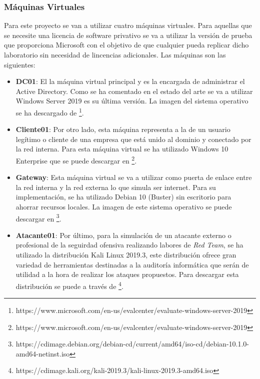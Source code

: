 \subsubsection{Máquinas Virtuales}

Para este proyecto se van a utilizar cuatro máquinas virtuales. Para aquellas que se necesite una licencia de software privativo se va a utilizar la versión de prueba que proporciona Microsoft con el objetivo de que cualquier pueda replicar dicho laboratorio sin necesidad de lincencias adicionales. Las máquinas son las siguientes:

\begin{itemize}
\item \textbf{DC01}: El la máquina virtual principal y es la encargada de administrar el Active Directory. Como se ha comentado en el estado del arte se va a utilizar Windows Server 2019 es su última versión. La imagen del sistema operativo se ha descargado de \footnote{https://www.microsoft.com/en-us/evalcenter/evaluate-windows-server-2019}.

\item \textbf{Cliente01}: Por otro lado, esta máquina representa a la de un usuario legítimo o cliente de una empresa que está unido al dominio y conectado por la red interna. Para esta máquina virtual se ha utilizado Windows 10 Enterprise que se puede descargar en \footnote{https://www.microsoft.com/en-us/evalcenter/evaluate-windows-server-2019}. 

\item \textbf{Gateway}: Esta máquina virtual se va a utilizar como puerta de enlace entre la red interna y la red externa lo que simula ser internet. Para su implementación, se ha utilizado Debian 10 (Buster) sin escritorio para ahorrar recursos locales. La imagen de este sistema operativo se puede descargar en \footnote{https://cdimage.debian.org/debian-cd/current/amd64/iso-cd/debian-10.1.0-amd64-netinst.iso}.

\item \textbf{Atacante01}: Por último, para la simulación de un atacante externo o profesional de la seguirdad ofensiva realizando labores de {\it Red Team}, se ha utilizado la distribución Kali Linux 2019.3, este distribución ofrece gran variedad de herramientas destinadas a la auditoría informática que serán de utilidad a la hora de realizar los ataques propuestos. Para descargar esta distribución se puede a través de \footnote{https://cdimage.kali.org/kali-2019.3/kali-linux-2019.3-amd64.iso}.

\end{itemize}


